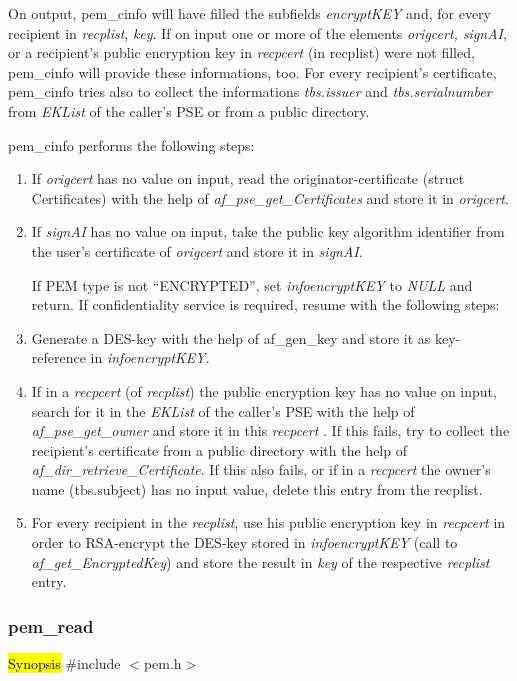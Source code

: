 On output, pem\_cinfo will have filled the subfields
{\em encryptKEY} and,  for every recipient in {\em recplist}, {\em key}.
If on input one or more of the elements
{\em origcert, signAI}, or a recipient's public encryption key
in {\em recpcert} (in recplist) were not filled,
pem\_cinfo will provide these informations, too.
For every recipient's certificate, pem\_cinfo tries also to collect the
informations {\em tbs.issuer} and {\em tbs.serialnumber}
from {\em EKList} of the caller's PSE or from a public directory.


pem\_cinfo performs the following steps:

\begin{enumerate}
\item
If {\em origcert} has no value on input,
read the originator-certificate (struct Certificates)
with the help of {\em af\_pse\_get\_Certificates}
and store it in {\em origcert}.
\item
If {\em signAI} has no value on input,
take the public key algorithm identifier
from the user's certificate of {\em origcert}
and store it in {\em signAI}.


If PEM type is not ``ENCRYPTED'',
set {\em info\pf encryptKEY} to {\em NULL} and return.
If confidentiality service is required, resume with the following steps:
\item
Generate a DES-key with the help of
af\_gen\_key and store it as key-reference in
{\em info\pf encryptKEY}.
\item
If in a {\em recpcert} (of {\em recplist})
the public encryption key has no value on input,
search for it in the {\em EKList} of the caller's PSE
with the help of {\em af\_pse\_get\_owner}
and store it in this {\em recpcert} .
If this fails, try to collect the recipient's certificate
from a public directory with the help of {\em af\_dir\_retrieve\_Certificate}.
If this also fails, or if
in a {\em recpcert}
the owner's name (tbs.subject) has no input value,
delete this entry from the recplist.
\item
For every recipient in the {\em recplist},
use his public encryption key in {\em recpcert}
in order to RSA-encrypt the DES-key stored in
{\em info\pf encryptKEY}
(call to {\em af\_get\_EncryptedKey}) and store
the result in {\em key} of the respective {\em recplist} entry.
\end{enumerate}

\subsubsection{pem\_read}
\label{pem_create}
\hl{Synopsis}
\#include $<$pem.h$>$ 

